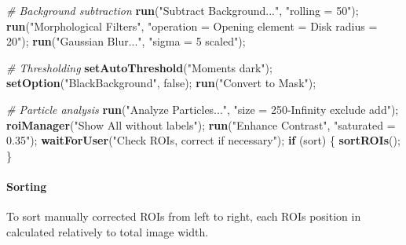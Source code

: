 \documentclass[11pt,singlespacinge,twoside]{reedthesis} %
\newenvironment{Shaded}{}{}
\newcommand{\CommentTok}[1]{\textit{#1}}
\newcommand{\ControlFlowTok}[1]{\textbf{#1}}
\newcommand{\KeywordTok}[1]{\textbf{#1}}
\newcommand{\NormalTok}[1]{#1}
\newcommand{\StringTok}[1]{#1}
\theoremstyle{definition}
\theoremstyle{definition}
\theoremstyle{definition}
\theoremstyle{remark}
\begin{document}
\scriptsize
\begin{Shaded}
\begin{Highlighting}[numbers=left,,]
\CommentTok{# Background subtraction}
    \KeywordTok{run}\NormalTok{(}\StringTok{"Subtract Background..."}\NormalTok{, }\StringTok{"rolling = 50"}\NormalTok{);}
    \KeywordTok{run}\NormalTok{(}\StringTok{"Morphological Filters"}\NormalTok{,}
        \StringTok{"operation = Opening element = Disk radius = 20"}\NormalTok{);}
    \KeywordTok{run}\NormalTok{(}\StringTok{"Gaussian Blur..."}\NormalTok{, }\StringTok{"sigma = 5 scaled"}\NormalTok{);}

\CommentTok{# Thresholding}
    \KeywordTok{setAutoThreshold}\NormalTok{(}\StringTok{"Moments dark"}\NormalTok{);}
    \KeywordTok{setOption}\NormalTok{(}\StringTok{"BlackBackground"}\NormalTok{, false);}
    \KeywordTok{run}\NormalTok{(}\StringTok{"Convert to Mask"}\NormalTok{);}

\CommentTok{# Particle analysis}
    \KeywordTok{run}\NormalTok{(}\StringTok{"Analyze Particles..."}\NormalTok{, }\StringTok{"size = 250-Infinity exclude add"}\NormalTok{);}
    \KeywordTok{roiManager}\NormalTok{(}\StringTok{"Show All without labels"}\NormalTok{);}
    \KeywordTok{run}\NormalTok{(}\StringTok{"Enhance Contrast"}\NormalTok{, }\StringTok{"saturated = 0.35"}\NormalTok{);}
    \KeywordTok{waitForUser}\NormalTok{(}\StringTok{"Check ROIs, correct if necessary"}\NormalTok{);}
    \ControlFlowTok{if}\NormalTok{ (sort) \{}
        \KeywordTok{sortROIs}\NormalTok{();}
\NormalTok{    \}}
\end{Highlighting}
\end{Shaded}
\normalsize

\hypertarget{sorting}{%
\paragraph{Sorting}\label{sorting}}

To sort manually corrected ROIs from left to right, each ROIs position in calculated relatively to total image width.
\end{document}
